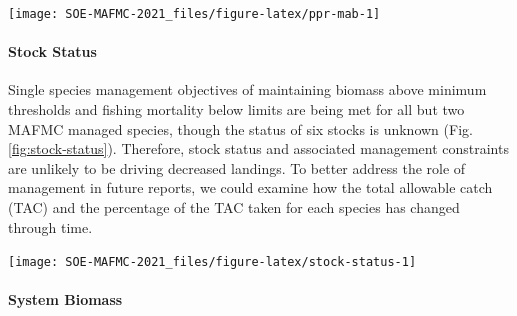 \documentclass[
  10pt,
]{article}
\let\origfigure\figure
\let\endorigfigure\endfigure
\renewenvironment{figure}[1][2] {
    \expandafter\origfigure\expandafter[H]
} {
    \endorigfigure
}
\begin{document}
\begin{figure}

{\centering \texttt{[image: SOE-MAFMC-2021\_files/figure-latex/ppr-mab-1]} 

}

\caption{Primary production required to support MAB commercial landings. Included are the top species accounting for 80\% of the landings in each year, with 15\% transfer efficiency assumed between trophic levels. PPD is total primary production. The solid line is based on satellite-derived PPD and the dashed line is based on primary production reconstructed using the mean of satellite-derived PPD from 1998-2010.}\label{fig:ppr-mab}
\end{figure}

\hypertarget{stock-status}{%
\paragraph{Stock Status}\label{stock-status}}

Single species management objectives of maintaining biomass above
minimum thresholds and fishing mortality below limits are being met for
all but two MAFMC managed species, though the status of six stocks is
unknown (Fig. \ref{fig:stock-status}). Therefore, stock status and
associated management constraints are unlikely to be driving decreased
landings. To better address the role of management in future reports, we
could examine how the total allowable catch (TAC) and the percentage of
the TAC taken for each species has changed through time.

\begin{figure}

{\centering \texttt{[image: SOE-MAFMC-2021\_files/figure-latex/stock-status-1]} 

}

\caption{Summary of single species status for MAFMC and jointly federally managed stocks (Goosefish and Spiny dogfish). Stocks in green are below the biomass threshold (overfished), stocks in orange are above the biomass threshold but below the biomass target, and stocks in purple are above the biomass target. Only one stock, Atlantic mackerel, has fishing mortality above the limit (subject to overfishing).}\label{fig:stock-status}
\end{figure}

\hypertarget{system-biomass}{%
\paragraph{System Biomass}\label{system-biomass}}
\end{document}
